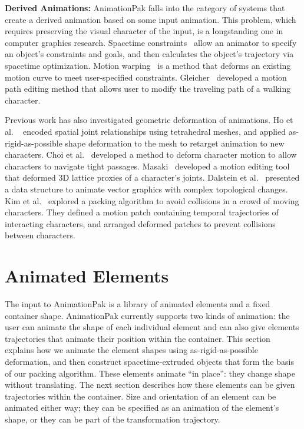 \textbf{Derived Animations:} 
AnimationPak falls into the category of systems that create a derived
animation based on some input animation. This problem, which
requires preserving the visual character of the input, is a 
longstanding one in computer graphics research.
Spacetime constraints~\cite{Witkin1988, Cohen1992} allow an animator
to specify an object's constraints and goals, and then calculates 
the object's trajectory via spacetime optimization.
Motion warping~\cite{Witkin1995} is a method that deforms an existing
motion curve to meet user-specified constraints.
Gleicher~\cite{Gleicher2001} developed a motion path editing method
that allows user to modify the traveling path of a walking character.



Previous work has also investigated geometric deformation of 
animations.
Ho et al. ~\cite{Ho2010} encoded spatial joint relationships 
using tetrahedral meshes, and applied as-rigid-as-possible shape deformation
to the mesh to retarget animation to new characters.
Choi et al.~\cite{Choi2011} developed a method to deform character motion
to allow characters to navigate tight passages.
Masaki~\cite{Oshita2017} developed a motion editing tool that deformed
3D lattice proxies of  a character's joints.
Dalstein et al.~\cite{Dalstein2015} presented a data structure
to animate vector graphics with complex topological changes.
Kim et al.~\cite{Kim2012} explored a packing algorithm
to avoid collisions in a crowd of moving characters.
They defined a motion patch containing temporal trajectories of interacting
characters, and arranged deformed patches to prevent collisions between
characters.




\section{Animated Elements}
\label{animationpak_animated_element}



The input to AnimationPak is a library of animated elements and a
fixed container shape.  AnimationPak currently supports two kinds
of animation: the user can animate the shape of each individual
element and can also give elements trajectories that animate
their position within the container.  This
section explains how we animate the element shapes using
as-rigid-as-possible deformation, and then construct
spacetime-extruded objects that form the basis of our packing
algorithm.  These elements animate ``in place'': they change
shape without translating. The next section describes how these
elements can be given trajectories within the
container. Size and orientation of an element can be animated
either way; they can be specified as an animation of the element's
shape, or they can be part of the transformation trajectory.





